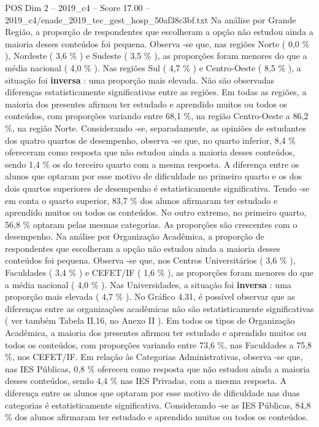 \begin{textsample}{POS Dim 2 – 2019\_c4 – Score 17.00 – 2019\_c4/enade\_2019\_tec\_gest\_hosp\_50af38c3bf.txt}
Na análise por Grande Região, a proporção de respondentes que escolheram a opção não estudou ainda a maioria desses conteúdos foi pequena.
Observa -se que, nas regiões Norte ( 0,0 \% ), Nordeste ( 3,6 \% ) e Sudeste ( 3,5 \% ), as proporções foram menores do que a média nacional ( 4,0 \% ).
Nas regiões Sul ( 4,7 \% ) e Centro-Oeste ( 8,5 \% ), a situação foi \textbf{inversa} : uma proporção mais elevada.
Não são observadas diferenças estatisticamente significativas entre as regiões.
Em todas as regiões, a maioria dos presentes afirmou ter estudado e aprendido muitos ou todos os conteúdos, com proporções variando entre 68,1 \%, na região Centro-Oeste a 86,2 \%, na região Norte.
Considerando -se, separadamente, as opiniões de estudantes dos quatro quartos de desempenho, observa -se que, no quarto inferior, 8,4 \% ofereceram como resposta que não estudou ainda a maioria desses conteúdos, sendo 1,4 \% os do terceiro quarto com a mesma resposta.
A diferença entre os alunos que optaram por esse motivo de dificuldade no primeiro quarto e os dos dois quartos superiores de desempenho é estatisticamente significativa.
Tendo -se em conta o quarto superior, 83,7 \% dos alunos afirmaram ter estudado e aprendido muitos ou todos os conteúdos.
No outro extremo, no primeiro quarto, 56,8 \% optaram pelas mesmas categorias.
As proporções são crescentes com o desempenho.
Na análise por Organização Acadêmica, a proporção de respondentes que escolheram a opção não estudou ainda a maioria desses conteúdos foi pequena.
Observa -se que, nos Centros Universitários ( 3,6 \% ), Faculdades ( 3,4 \% ) e CEFET/IF ( 1,6 \% ), as proporções foram menores do que a média nacional ( 4,0 \% ).
Nas Universidades, a situação foi \textbf{inversa} : uma proporção mais elevada ( 4,7 \% ).
No Gráfico 4.31, é possível observar que as diferenças entre as organizações acadêmicas não são estatisticamente significativas ( ver também Tabela II.16, no Anexo II ).
Em todos os tipos de Organização Acadêmica, a maioria dos presentes afirmou ter estudado e aprendido muitos ou todos os conteúdos, com proporções variando entre 73,6 \%, nas Faculdades a 75,8 \%, nos CEFET/IF.
Em relação às Categorias Administrativas, observa -se que, nas IES Públicas, 0,8 \% ofereceu como resposta que não estudou ainda a maioria desses conteúdos, sendo 4,4 \% nas IES Privadas, com a mesma resposta.
A diferença entre os alunos que optaram por esse motivo de dificuldade nas duas categorias é estatisticamente significativa.
Considerando -se as IES Públicas, 84,8 \% dos alunos afirmaram ter estudado e aprendido muitos ou todos os conteúdos.

\end{textsample}
